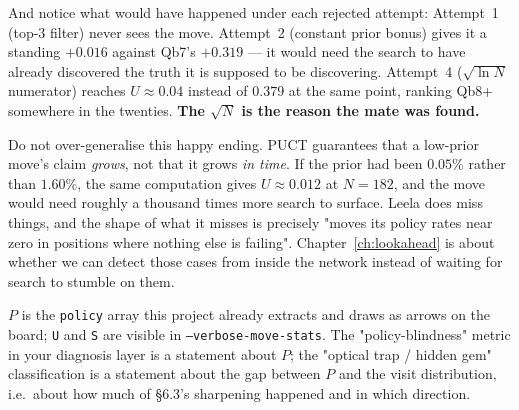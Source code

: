 And notice what would have happened under each rejected attempt: Attempt~1 (top-3 filter)
never sees the move. Attempt~2 (constant prior bonus) gives it a standing $+0.016$ against
Qb7's $+0.319$ --- it would need the search to have already discovered the truth it is
supposed to be discovering. Attempt~4 ($\sqrt{\ln N}$ numerator) reaches $U \approx 0.04$
instead of $0.379$ at the same point, ranking Qb8+ somewhere in the twenties. \textbf{The
$\sqrt{N}$ is the reason the mate was found.}

\begin{pitfall}
Do not over-generalise this happy ending. PUCT guarantees that a low-prior move's claim
\emph{grows}, not that it grows \emph{in time}. If the prior had been $0.05\%$ rather than
$1.60\%$, the same computation gives $U \approx 0.012$ at $N=182$, and the move would need
roughly a thousand times more search to surface. Leela does miss things, and the shape of
what it misses is precisely "moves its policy rates near zero in positions where nothing else
is failing". Chapter~\ref{ch:lookahead} is about whether we can detect those cases from
inside the network instead of waiting for search to stumble on them.
\end{pitfall}

\begin{repobox}[title={in this repository}]
$P$ is the \texttt{policy} array this project already extracts and draws as arrows on the
board; \texttt{U} and \texttt{S} are visible in \texttt{--verbose-move-stats}. The
"policy-blindness" metric in your diagnosis layer is a statement about $P$; the
"optical trap / hidden gem" classification is a statement about the gap between $P$ and the
visit distribution, i.e.\ about how much of §6.3's sharpening happened and in which direction.
\end{repobox}

